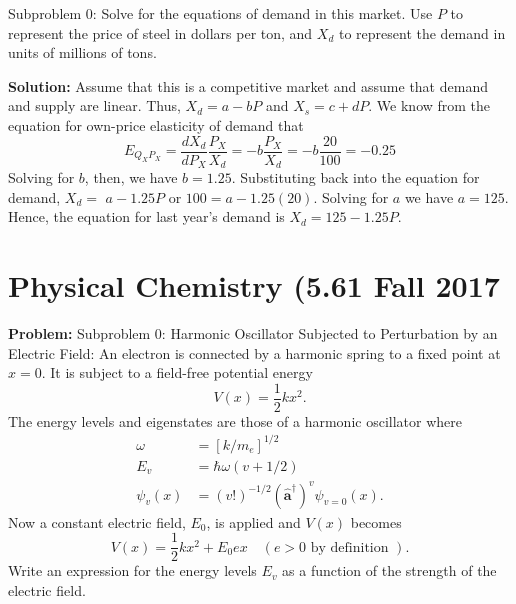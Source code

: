 \documentclass[10pt]{article}
\begin{document}
Subproblem 0: Solve for the equations of demand in this market.  Use $P$ to represent the price of steel in dollars per ton, and $X_{d}$ to represent the demand in units of millions of tons.


\textbf{Solution:}
Assume that this is a competitive market and assume that demand and supply are linear. Thus, $X_{d}=a-b P$ and $X_{s}=c+d P$. We know from the equation for own-price elasticity of demand that
\[
E_{Q_{X} P_{X}}=\frac{d X_{d}}{d P_{X}} \frac{P_{X}}{X_{d}}=-b \frac{P_{X}}{X_{d}}=-b \frac{20}{100}=-0.25
\]
Solving for $b$, then, we have $b=1.25$. Substituting back into the equation for demand, $X_{d}=$ $a-1.25 P$ or $100=a-1.25(20)$. Solving for $a$ we have $a=125$. Hence, the equation for last year's demand is $\boxed{X_{d}=125-1.25 P}$.


\section{Physical Chemistry (5.61 Fall 2017}

\textbf{Problem:}
Subproblem 0: Harmonic Oscillator Subjected to Perturbation by an Electric Field: An electron is connected by a harmonic spring to a fixed point at $x=0$. It is subject to a field-free potential energy
\[
V(x)=\frac{1}{2} k x^{2} .
\]
The energy levels and eigenstates are those of a harmonic oscillator where
\[
\begin{aligned}
\omega &=\left[k / m_{e}\right]^{1 / 2} \\
E_{v} &=\hbar \omega(v+1 / 2) \\
\psi_{v}(x) &=(v !)^{-1 / 2}\left(\hat{\boldsymbol{a}}^{\dagger}\right)^{v} \psi_{v=0}(x) .
\end{aligned}
\]
Now a constant electric field, $E_{0}$, is applied and $V(x)$ becomes
\[
V(x)=\frac{1}{2} k x^{2}+E_{0} e x \quad(e>0 \text { by definition }) .
\]
Write an expression for the energy levels $E_{v}$ as a function of the strength of the electric field.
\end{document}

